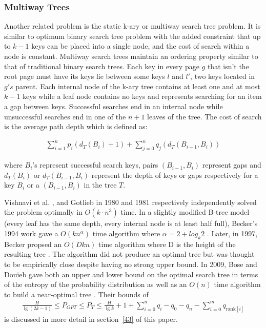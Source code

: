 \documentclass[]{beamer}
\theoremstyle{plain}
\begin{document}
\begin{frame} \frametitle{Multiway Trees} \label{sec:MWT}

Another related problem is the static k-ary or multiway search tree problem. It is similar to optimum binary search tree problem with the added constraint that up to $k-1$ keys can be placed into a single node, and the cost of search within a node is constant. Multiway search trees maintain an ordering property similar to that of traditional binary search trees. Each key in every page $g$ that isn't the root page must have its keys lie between some keys $l$ and $l'$, two keys located in $g's$ parent. Each internal node of the k-ary tree contains at least one and at most $k-1$ keys while a leaf node contains no keys and represents searching for an item a gap between keys. Successful searches end in an internal node while unsuccessful searches end in one of the $n+1$ leaves of the tree. The cost of search is the average path depth which is defined as:

\begin{align*}
\sum_{i=1}^{n} p_i(d_T(B_i)+1) + \sum_{j=0}^{n} q_j(d_T(B_{i-1},B_i))
\end{align*}

\noindent where $B_i$'s represent successful search keys, pairs $(B_{i-1},B_i)$ represent gaps and $d_T(B_i)$  or $d_T(B_{i-1},B_i)$ represent the depth of keys or gaps respectively for a key $B_i$ or a $(B_{i-1},B_i)$ in the tree $T$.

Vishnavi et al. \cite{vaishnavi1980optimum}, and Gotlieb  \cite{gotlieb1981optimal} in 1980 and 1981 respectively independently solved the problem optimally in $O(k\cdot n^3)$ time. In a slightly modified B-tree model (every leaf has the same depth, every internal node is at least half full), Becker's 1994 work gave a $O(kn^{\alpha})$ time algorithm where $\alpha=2+log_k 2$ \cite{becker1994new}. Later, in 1997, Becker propsed an $O(Dkn)$ time algorithm where D is the height of the resulting tree \cite{becker1997construction}. The algorithm did not produce an optimal tree but was thought to be empirically close despite having no strong upper bound. In 2009, Bose and Dou\"{i}eb gave both an upper and lower bound on the optimal search tree in terms of the entropy of the probability distribution as well as an $O(n)$ time algorithm to build a near-optimal tree \cite{bose2009efficient}. Their bounds of
\begin{align*}
\frac{H}{\lg(2k-1)} \leq P_{OPT} \leq P_T \leq \frac{H}{\lg k} + 1 + \sum_{i=0}^n q_i - q_0 - q_n - \sum_{i=0}^m q_{\text{rank}[i]}
\end{align*}
is discussed in more detail in section~\ref{43} of this paper.
\end{frame}
\end{document}
